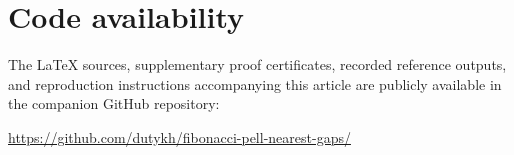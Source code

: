 \documentclass[11pt,reqno]{amsart}
\theoremstyle{definition}
\begin{document}
\maketitle











\clearpage
\appendix


\section*{Code availability}
The LaTeX sources, supplementary proof certificates, recorded reference
outputs, and reproduction instructions accompanying this article are publicly
available in the companion GitHub repository:
\begin{center}
 \url{https://github.com/dutykh/fibonacci-pell-nearest-gaps/}
\end{center}



\end{document}
